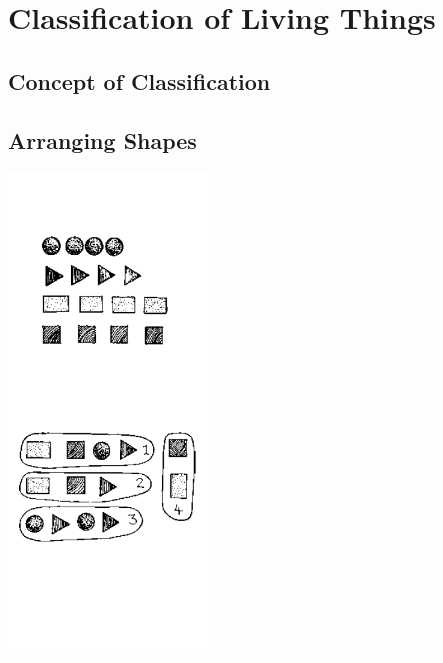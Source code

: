 \section{Classification of Living Things} 

\begin{multicols}{2}


\section*{Concept of Classification}


\subsection{Arranging Shapes} %

\begin{center}
\includegraphics[width=0.4\textwidth]{./img/source/arranging-shapes.png}
\end{center}


\end{multicols}
